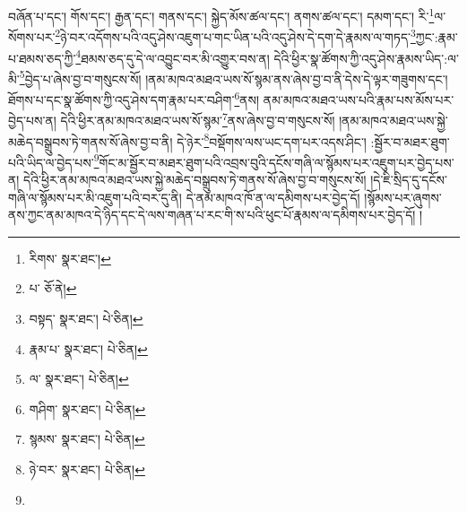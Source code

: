 བཞོན་པ་དང་། གོས་དང་། རྒྱན་དང་། གནས་དང་། སྐྱེད་མོས་ཚལ་དང་། ནགས་ཚལ་དང་། དམག་དང་། རི་\footnote{རིགས་  སྣར་ཐང་། }ལ་སོགས་པར་\footnote{པ་  ཅོ་ནེ། }ཉེ་བར་འདོགས་པའི་འདུ་ཤེས་འཇུག་པ་གང་ཡིན་པའི་འདུ་ཤེས་དེ་དག་དེ་རྣམས་ལ་གཏད་\footnote{བསྟད་  སྣར་ཐང་།  པེ་ཅིན། }ཀྱང་:རྣམ་པ་ཐམས་ཅད་ཀྱི་\footnote{རྣམ་པ་  སྣར་ཐང་།  པེ་ཅིན། }ཐམས་ཅད་དུ་དེ་ལ་འབྱུང་བར་མི་འགྱུར་བས་ན། དེའི་ཕྱིར་སྣ་ཚོགས་ཀྱི་འདུ་ཤེས་རྣམས་ཡིད་:ལ་མི་\footnote{ལ་  སྣར་ཐང་།  པེ་ཅིན། }བྱེད་པ་ཞེས་བྱ་བ་གསུངས་སོ། །ནམ་མཁའ་མཐའ་ཡས་སོ་སྙམ་ནས་ཞེས་བྱ་བ་ནི་དེས་དེ་ལྟར་གཟུགས་དང་། ཐོགས་པ་དང་སྣ་ཚོགས་ཀྱི་འདུ་ཤེས་དག་རྣམ་པར་བཤིག་\footnote{གཤིག་  སྣར་ཐང་།  པེ་ཅིན། }ནས། ནམ་མཁའ་མཐའ་ཡས་པའི་རྣམ་པས་མོས་པར་བྱེད་པས་ན། དེའི་ཕྱིར་ནམ་མཁའ་མཐའ་ཡས་སོ་སྙམ་\footnote{སྙམས་  སྣར་ཐང་།  པེ་ཅིན། }ནས་ཞེས་བྱ་བ་གསུངས་སོ། །ནམ་མཁའ་མཐའ་ཡས་སྐྱེ་མཆེད་བསྒྲུབས་ཏེ་གནས་སོ་ཞེས་བྱ་བ་ནི། དེ་ཉེར་\footnote{ཉེ་བར་  སྣར་ཐང་།  པེ་ཅིན། }བསྡོགས་ལས་ཡང་དག་པར་འདས་ཤིང་། :སྦྱོར་བ་མཐར་ཐུག་པའི་ཡིད་ལ་བྱེད་པས་\footnote{}གོང་མ་སྦྱོར་བ་མཐར་ཐུག་པའི་འབྲས་བུའི་དངོས་གཞི་ལ་སྙོམས་པར་འཇུག་པར་བྱེད་པས་ན། དེའི་ཕྱིར་ནམ་མཁའ་མཐའ་ཡས་སྐྱེ་མཆེད་བསྒྲུབས་ཏེ་གནས་སོ་ཞེས་བྱ་བ་གསུངས་སོ། །དེ་ཇི་སྲིད་དུ་དངོས་གཞི་ལ་སྙོམས་པར་མི་འཇུག་པའི་བར་དུ་ནི། དེ་ནམ་མཁའ་ཁོ་ན་ལ་དམིགས་པར་བྱེད་དོ། །སྙོམས་པར་ཞུགས་ནས་ཀྱང་ནམ་མཁའ་དེ་ཉིད་དང་དེ་ལས་གཞན་པ་རང་གི་ས་པའི་ཕུང་པོ་རྣམས་ལ་དམིགས་པར་བྱེད་དོ། །
